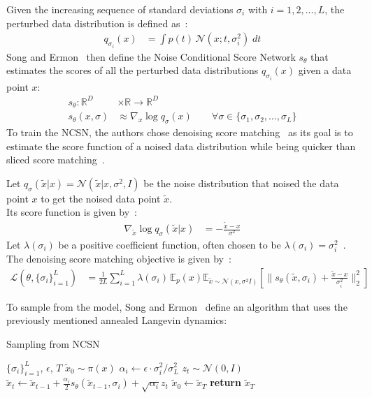 \documentclass[twoside]{article}
\numberwithin{equation}{section}
\numberwithin{figure}{section}
\begin{document}
Given the increasing sequence of standard deviations $\sigma_i$ with $i = 1, 2, \ldots, L$, the perturbed data distribution is defined as~\cite{song2020generative}:
\begin{align}
  q_{\sigma_i}(x) &= \int p(t) \, \mathcal{N}(x; t, \sigma_i^2) \; dt
\end{align}
Song and Ermon~\cite{song2020generative} then define the Noise Conditional Score Network $s_\theta$ that estimates the scores of all the perturbed data distributions $q_{\sigma_i}(x)$ given a data point $x$:
\begin{align}
  s_\theta : \mathbb{R}^D &\times \mathbb{R} \rightarrow \mathbb{R}^D \\
  s_\theta (x, \sigma) &\approx \nabla_x \log q_\sigma (x) \qquad \forall \sigma \in \{ \sigma_1, \sigma_2, \ldots, \sigma_L \}
\end{align}
To train the NCSN, the authors chose denoising score matching~\cite{vincent2010denoising} as its goal is to estimate the score function of a noised data distribution while being quicker than sliced score matching~\cite{song2020generative, song2019sliced}.

Let $q_\sigma (\tilde{x} | x) = \mathcal{N}(\tilde{x} | x, \sigma^2, I)$ be the noise distribution that noised the data point $x$ to get the noised data point $\tilde{x}$. \\
Its score function is given by~\cite{song2020generative}:
\begin{align}
  \nabla_{\tilde{x}} \log q_\sigma (\tilde{x} | x) &= - \frac{\tilde{x} - x}{\sigma^2} 
\end{align}
Let $\lambda (\sigma_i)$ be a positive coefficient function, often chosen to be $\lambda (\sigma_i) = \sigma_i^2$~\cite{songblog, song2020generative}. \\
The denoising score matching objective is given by~\cite{song2020generative}:
\begin{align}
  \mathcal{L}(\theta, \{ \sigma_i \}_{i=1}^L) &= \frac{1}{2L} \sum^L_{i=1} \lambda(\sigma_i) \, \mathbb{E}_p(x) \mathbb{E}_{\tilde{x} \sim \mathcal{N}(x, \sigma^2 I)} \left[ \| s_\theta (\tilde{x}, \sigma_i) + \frac{\tilde{x} - x}{\sigma_i^2} \|_2^2 \right]
\end{align}

To sample from the model, Song and Ermon~\cite{song2020generative} define an algorithm that uses the previously mentioned annealed Langevin dynamics:
\begin{algorithm}[H]
  \centering
  \caption{Sampling from NCSN}\label{alg:ncsn}
  \begin{algorithmic}[1]
    \Require $\{\sigma_i\}_{i=1}^L$, $\epsilon$, $T$ 
    \State $\tilde{x}_0 \sim \pi(x)$
      \State $\alpha_i \leftarrow \epsilon \cdot \sigma_i^2 / \sigma_L^2$
        \State $z_t \sim \mathcal{N}(0, I)$
        \State $\tilde{x}_t \leftarrow \tilde{x}_{t-1} + \frac{\alpha_i}{2} s_\theta (\tilde{x}_{t-1}, \sigma_i) + \sqrt{\alpha_i} z_t$
      \EndFor
      \State $\tilde{x}_0 \leftarrow \tilde{x}_T$
    \EndFor
    \State \textbf{return} $\tilde{x}_T$
  \end{algorithmic}
\end{algorithm}
\end{document}
